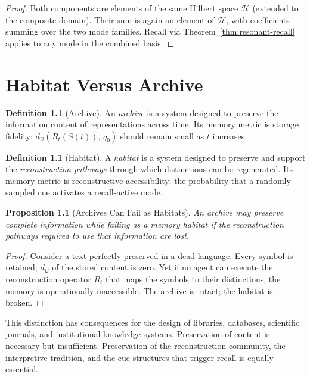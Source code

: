 \documentclass[12pt, oneside]{book}
\theoremstyle{plain}
\newtheorem{proposition}[theorem]{Proposition}
\theoremstyle{definition}
\newtheorem{definition}[theorem]{Definition}
\theoremstyle{remark}
\newcommand{\calH}{\mathcal{H}}
\newcommand{\calQ}{\mathcal{Q}}
\begin{document}
\begin{proof}
Both components are elements of the same Hilbert space
$\calH$ (extended to the composite domain).
Their sum is again an element of $\calH$,
with coefficients summing over the two mode families.
Recall via Theorem~\ref{thm:resonant-recall} applies
to any mode in the combined basis.
\end{proof}

\chapter{Habitat Versus Archive}

\begin{definition}[Archive]
An \emph{archive} is a system designed to preserve
the information content of representations across time.
Its memory metric is storage fidelity:
$d_{\calQ}(R_t(S(t)),\, q_0)$ should remain small as $t$
increases.
\end{definition}

\begin{definition}[Habitat]
A \emph{habitat} is a system designed to preserve and
support the \emph{reconstruction pathways} through which
distinctions can be regenerated.
Its memory metric is reconstructive accessibility:
the probability that a randomly sampled cue activates
a recall-active mode.
\end{definition}

\begin{proposition}[Archives Can Fail as Habitats]
An archive may preserve complete information while
failing as a memory habitat if the reconstruction
pathways required to use that information are lost.
\end{proposition}

\begin{proof}
Consider a text perfectly preserved in a dead language.
Every symbol is retained; $d_{\calQ}$ of the stored
content is zero.
Yet if no agent can execute the reconstruction operator
$R_t$ that maps the symbols to their distinctions,
the memory is operationally inaccessible.
The archive is intact; the habitat is broken.
\end{proof}

This distinction has consequences for the design of
libraries, databases, scientific journals, and institutional
knowledge systems.
Preservation of content is necessary but insufficient.
Preservation of the reconstruction community, the
interpretive tradition, and the cue structures that
trigger recall is equally essential.
\end{document}
